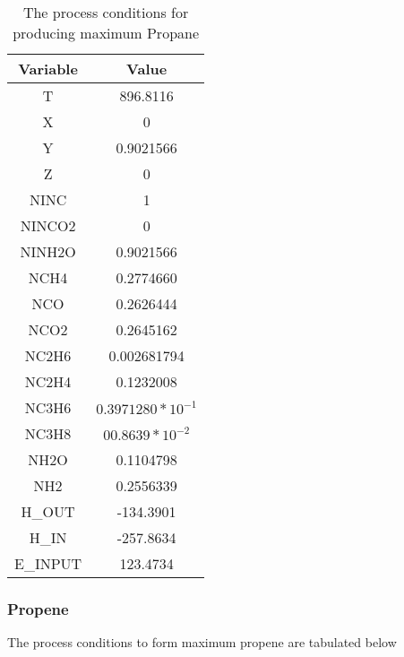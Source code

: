 \documentclass[journal=iecred,manuscript=article]{achemso}
\begin{document}
\FloatBarrier
\begin{table}[H]
\caption{The process conditions for producing maximum Propane} 
\centering
\begin{tabular}{|c|c|}
\hline\hline %
Variable & Value \\ 
[1ex] %
\hline %
T	& 896.8116 \\
\hline
X	 & 0 \\
\hline
Y	& 0.9021566 \\
\hline
Z	&  0 \\
\hline
NINC	& 1 \\
\hline
NINCO2	& 0 \\
\hline
NINH2O	&  0.9021566 \\
\hline
NCH4 &	 0.2774660 \\
\hline
NCO	&  0.2626444  \\
\hline
NCO2	& 0.2645162 \\
\hline
NC2H6	& 0.002681794 \\
\hline
NC2H4	& 0.1232008 \\
\hline
NC3H6	& $0.3971280*10^{-1}$ \\
\hline
NC3H8	& $00.8639*10^{-2}$ \\
\hline
NH2O	& 0.1104798 \\
\hline
NH2 & 0.2556339 \\
\hline
H_{OUT}	& -134.3901  \\
\hline
H_{IN}	& -257.8634 \\
\hline
E_{INPUT}	& 123.4734 \\
\hline 
\end{tabular}
\end{table}
\FloatBarrier


\newpage
\subsubsection{Propene}
The process conditions to form maximum propene are tabulated below 
\end{document}
